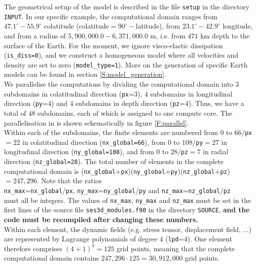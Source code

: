 The geometrical setup of the model is described in the file \texttt{setup} in the directory \texttt{INPUT}. In our specific example, the computational domain ranges from $47.1^\circ - 55.9^\circ$ colatitude (colatitude$=90^\circ -$latitude), from $23.1^\circ - 42.9^\circ$ longitude, and from a radius of $5,900,000.0 - 6,371,000.0$ m, i.e. from $471$ km depth to the surface of the Earth. For the moment, we ignore visco-elastic dissipation (\texttt{is\_diss=0}), and we construct a homogeneous model where all velocities and density are set to zero (\texttt{model\_type=1}). More on the generation of specific Earth models can be found in section \ref{S:model_generation}.\\[5pt]
We parallelise the computations by dividing the computational domain into $3$ subdomains in colatitudinal direction (\texttt{px}=3), $4$ subdomains in longitudinal direction (\texttt{py}=4) and $4$ subdomains in depth direction (\texttt{pz}=4). Thus, we have a total of $48$ subdomains, each of which is assigned to one compute core. The parallelisation in \SES is shown schematically in figure \ref{F:parallel}.\\[5pt]
Within each of the subdomains, the finite elements are numbered from $0$ to $66$/\texttt{px}$=22$ in colatitudinal direction (\texttt{nx\_global=66}), from $0$ to $108$/\texttt{py}$=27$ in longitudinal direction (\texttt{ny\_global=108}), and from $0$ to $28$/\texttt{pz}$=7$ in radial direction (\texttt{nz\_global=28}). The total number of elements in the complete computational domain is (\texttt{nx\_global}+\texttt{px})(\texttt{ny\_global}+\texttt{py})(\texttt{nz\_global}+\texttt{pz})$=247,296$. Note that the ratios\\[5pt]
\texttt{nx\_max}=\texttt{nx\_global}/\texttt{px}, \texttt{ny\_max}=\texttt{ny\_global}/\texttt{py} and \texttt{nz\_max}=\texttt{nz\_global}/\texttt{pz}\\[5pt]
must all be integers. The values of \texttt{nx\_max}, \texttt{ny\_max} and \texttt{nz\_max} must be set in the first lines of the source file \texttt{ses3d\_modules.f90} in the directory \texttt{SOURCE}, \textbf{and the code must be recompiled after changing these numbers.}\\[5pt]
Within each element, the dynamic fields (e.g. stress tensor, displacement field, ...) are represented by Lagrange polynomials of degree $4$ (\texttt{lpd}=4). One element therefore comprises $(4+1)^3=125$ grid points, meaning that the complete computational domain contains $247,296 \cdot 125 = 30,912,000$ grid points.\\[5pt]
